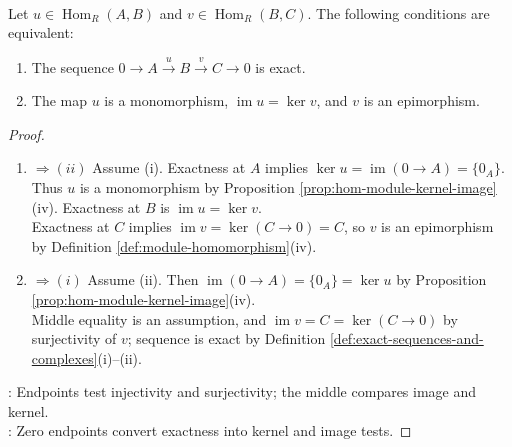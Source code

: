 \begin{proposition} \label{prop:short-exact-sequence-criterion} \\
Let $u\in\operatorname{Hom}_R(A,B)$ and $v\in\operatorname{Hom}_R(B,C)$. The following conditions are equivalent:
\begin{enumerate}[label=(\roman*)]
\setlength{\itemsep}{0pt}
\item The sequence $0\to A\xrightarrow{u}B\xrightarrow{v}C\to0$ is exact.
\item The map $u$ is a monomorphism, $\operatorname{im}u=\ker v$, and $v$ is an epimorphism.
\end{enumerate}
\begin{proof}
\begin{enumerate}[label=(\roman*)]
\setlength{\itemsep}{0pt}
\item[$(i)$] $\Rightarrow (ii)$ Assume (i). Exactness at $A$ implies $\ker u=\operatorname{im}(0\to A)=\{0_A\}$.\\
Thus $u$ is a monomorphism by Proposition \ref{prop:hom-module-kernel-image}(iv). Exactness at $B$ is $\operatorname{im}u=\ker v$.\\
Exactness at $C$ implies $\operatorname{im}v=\ker(C\to0)=C$, so $v$ is an epimorphism by Definition \ref{def:module-homomorphism}(iv).
\item[$(ii)$] $\Rightarrow (i)$ Assume (ii). Then $\operatorname{im}(0\to A)=\{0_A\}=\ker u$ by Proposition \ref{prop:hom-module-kernel-image}(iv).\\
Middle equality is an assumption, and $\operatorname{im}v=C=\ker(C\to0)$ by surjectivity of $v$; sequence is exact by Definition \ref{def:exact-sequences-and-complexes}(i)--(ii).
\end{enumerate}
: Endpoints test injectivity and surjectivity; the middle compares image and kernel.\\
: Zero endpoints convert exactness into kernel and image tests.
\end{proof}
\end{proposition}

